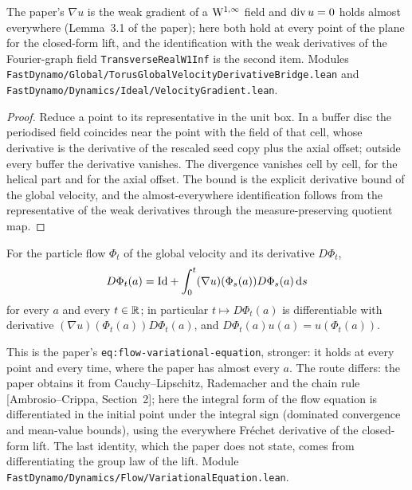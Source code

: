 The paper's $\nabla u$ is the weak gradient of a $\mathrm{W}^{1,\infty}$ field and $\operatorname{div} u=0$ holds
almost everywhere (Lemma~3.1 of the paper); here both hold at every point of the plane for the
closed-form lift, and the identification with the weak derivatives of the Fourier-graph field
\texttt{TransverseRealW1Inf} is the second item.  Modules
\texttt{FastDynamo/Global/TorusGlobalVelocityDerivativeBridge.lean} and
\texttt{FastDynamo/Dynamics/Ideal/VelocityGradient.lean}.

\begin{proof}
  \leanok
  Reduce a point to its representative in the unit box.  In a buffer disc the periodised field
  coincides near the point with the field of that cell, whose derivative is the derivative of
  the rescaled seed copy plus the axial offset; outside every buffer the derivative vanishes.
  The divergence vanishes cell by cell, for the helical part and for the axial offset.  The
  bound is the explicit derivative bound of the global velocity, and the almost-everywhere
  identification follows from the representative of the weak derivatives through the
  measure-preserving quotient map.
\end{proof}

\begin{lemma}
  \label{lem:dynamics:variational-equation}
  \leanok
  For the particle flow $\Phi_t$ of the global velocity and its derivative $D\Phi_t$,
  \[
    D\Phi_t(a)=\mathrm{Id}+\int_0^t(\nabla u)(\Phi_s(a))D\Phi_s(a)\,\mathrm{d} s
  \]
  for every $a$ and every $t\in\mathbb{R}$; in particular $t\mapsto D\Phi_t(a)$ is differentiable with
  derivative $(\nabla u)(\Phi_t(a))D\Phi_t(a)$, and $D\Phi_t(a)u(a)=u(\Phi_t(a))$.
\end{lemma}

This is the paper's \texttt{eq:flow-variational-equation}, stronger: it holds at every point
and every time, where the paper has almost every $a$.  The route differs: the paper obtains it
from Cauchy--Lipschitz, Rademacher and the chain rule [Ambrosio--Crippa, Section~2]; here the
integral form of the flow equation is differentiated in the initial point under the integral
sign (dominated convergence and mean-value bounds), using the everywhere Fr\'echet derivative
of the closed-form lift.  The last identity, which the paper does not state, comes from
differentiating the group law of the lift.  Module
\texttt{FastDynamo/Dynamics/Flow/VariationalEquation.lean}.

